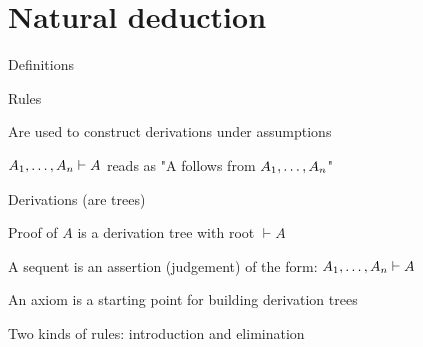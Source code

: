 \section{Natural deduction}
\enumstart
	\item Definitions
	\enumstart
		\item Rules
		\enumstart
			\item Are used to construct derivations under assumptions
			\item $A_1, \mathellipsis, A_n  \vdash A$ reads as "A follows from $A_1, \mathellipsis, A_n$"
		\enumend
		\item Derivations (are trees)
			\\ 
		\item Proof of $A$ is a derivation tree with root $\vdash A$
		\item A sequent is an assertion (judgement) of the form: $A_1, \mathellipsis, A_n \vdash A$
		\item An axiom is a starting point for building derivation trees
		\item Two kinds of rules: introduction and elimination
	\enumend
\enumend
